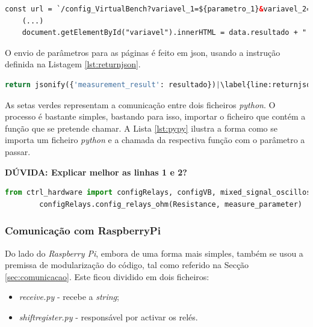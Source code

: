 \begin{minipage}{0.9\linewidth}
	\begin{lstlisting}[language=html, escapechar=|, caption=Comunicação \acrshort{html} - \textit{views.py}, label=lst:htmlpy]
	const url = `/config_VirtualBench?variavel_1=${parametro_1}&variavel_2=${parametro_2}&variavel_3=${parametro_3}`; |\label{line:parametros}|
	(...)
	document.getElementById("variavel").innerHTML = data.resultado + " V"; |\label{line:resultado}|
	\end{lstlisting}
\end{minipage}

O envio de parâmetros para as páginas é feito em \acrfull{json}, usando a instrução definida na Listagem \ref{lst:returnjson}.

\begin{minipage}{0.9\linewidth}
	\begin{lstlisting}[language=python, escapechar=|, caption=Comunicação \textit{views.py} - \acrshort{html}, label=lst:returnjson]
	return jsonify({'measurement_result': resultado})|\label{line:returnjson}|
	\end{lstlisting}
\end{minipage}

As setas verdes representam a comunicação entre dois ficheiros \textit{python}. O processo é bastante simples, bastando para isso, importar o ficheiro que contém a função que se pretende chamar. A Lista \ref{lst:pypy} ilustra a forma como se importa um ficheiro \textit{python} e a chamada da respectiva função com o parâmetro a passar.

\textbf{DÚVIDA: Explicar melhor as linhas 1 e 2?}

\begin{minipage}{0.9\linewidth}
	\begin{lstlisting}[language=python, escapechar=|, caption=Comunicação \textit{python} - \textit{python}, label=lst:pypy]
		from ctrl_hardware import configRelays, configVB, mixed_signal_oscilloscope |\label{line:ficheiros}|
		configRelays.config_relays_ohm(Resistance, measure_parameter) |\label{line:trueparameter}|
	\end{lstlisting}
\end{minipage}

\subsubsection{Comunicação com RaspberryPi}
\label{sec:raspberrypi}
Do lado do \textit{Raspberry Pi}, embora de uma forma mais simples, também se usou a premissa de modularização do código, tal como referido na Secção \ref{sec:comunicacao}. Este ficou dividido em dois ficheiros:
\begin{itemize}
	\item \textit{receive.py} - recebe a \textit{string};
	\item \textit{shift\textunderscore register.py} - responsável por activar os relés.
\end{itemize}

